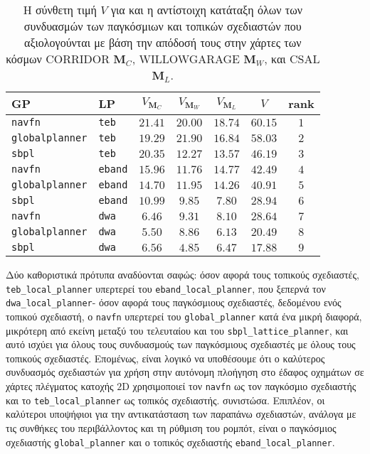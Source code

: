 \begin{table}\centering
\renewcommand{\arraystretch}{1.3}
\begin{tabular}{llccccc}
  GP & LP & $V_{\bm{M}_C}$ & $V_{\bm{M}_W}$ & $V_{\bm{M}_L}$ & $V$ & rank \\ \toprule
  \texttt{navfn} & \texttt{teb} & $21.41$ & $20.00$ & $18.74$ & $60.15$ & $1$ \\
  \texttt{globalplanner} & \texttt{teb} & $19.29$ & $21.90$ & $16.84$ & $58.03$ & $2$ \\
  \texttt{sbpl} & \texttt{teb} & $20.35$ & $12.27$ & $13.57$ & $46.19$ & $3$ \\
  \texttt{navfn} & \texttt{eband} & $15.96$ & $11.76$ & $14.77$ & $42.49$ & $4$ \\
  \texttt{globalplanner} & \texttt{eband} & $14.70$ & $11.95$ & $14.26$ & $40.91$ & $5$ \\
  \texttt{sbpl} & \texttt{eband} & $10.99$ & $9.85$ & $7.80$ & $28.94$ & $6$ \\
  \texttt{navfn} & \texttt{dwa} & $6.46$ & $9.31$ & $8.10$ & $28.64$ & $7$ \\
  \texttt{globalplanner} & \texttt{dwa} & $5.50$ & $8.86$ & $6.13$ & $20.49$ & $8$ \\
  \texttt{sbpl} & \texttt{dwa} & $6.56$ & $4.85$ & $6.47$ & $17.88$ & $9$ \\ \bottomrule
\end{tabular}
\caption{Η σύνθετη τιμή $V$ για και η αντίστοιχη κατάταξη όλων των συνδυασμών
         των παγκόσμιων και τοπικών σχεδιαστών που αξιολογούνται με βάση την απόδοσή τους στην
         χάρτες των κόσμων CORRIDOR $\bm{M}_C$, WILLOWGARAGE $\bm{M}_W$, και CSAL
         $\bm{M}_L$.}
\label{tbl:rank_overall}
\end{table}

Δύο καθοριστικά πρότυπα αναδύονται σαφώς: όσον αφορά τους τοπικούς σχεδιαστές,
\texttt{teb\_local\_planner} υπερτερεί του \texttt{eband\_local\_planner},
που ξεπερνά τον \texttt{dwa\_local\_planner}- όσον αφορά τους παγκόσμιους σχεδιαστές,
δεδομένου ενός τοπικού σχεδιαστή, ο \texttt{navfn} υπερτερεί του \texttt{global\_planner} κατά ένα
μικρή διαφορά, μικρότερη από εκείνη μεταξύ του τελευταίου και του
\texttt{sbpl\_lattice\_planner}, και αυτό ισχύει για όλους τους συνδυασμούς των
παγκόσμιους σχεδιαστές με όλους τους τοπικούς σχεδιαστές. Επομένως, είναι λογικό να υποθέσουμε
ότι ο καλύτερος συνδυασμός σχεδιαστών για χρήση στην αυτόνομη πλοήγηση στο έδαφος
οχημάτων σε χάρτες πλέγματος κατοχής $2$D χρησιμοποιεί τον \texttt{navfn} ως τον παγκόσμιο
σχεδιαστής και το \texttt{teb\_local\_planner} ως τοπικός σχεδιαστής.
συνιστώσα. Επιπλέον, οι καλύτεροι υποψήφιοι για την αντικατάσταση των παραπάνω
σχεδιαστών, ανάλογα με τις συνθήκες του περιβάλλοντος και τη ρύθμιση του
ρομπότ, είναι ο παγκόσμιος σχεδιαστής \texttt{global\_planner} και ο τοπικός σχεδιαστής
\texttt{eband\_local\_planner}.
